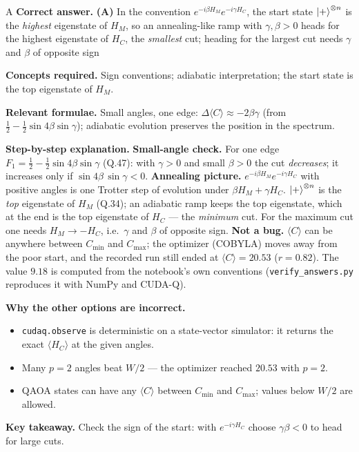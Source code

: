 \documentclass[11pt,a4paper]{article}
\newcommand{\qsep}{\par\vspace{2pt}{\color{black!15}\hrule}\vspace{4pt}}
\begin{document}
\begin{solbox}{A}
\textbf{\color{brand}Correct answer.} \textcolor{okgreen}{\textbf{(A)}} In the convention $e^{-i\beta H_M}e^{-i\gamma H_C}$, the start state $\ket+^{\otimes n}$ is the \emph{highest} eigenstate of $H_M$, so an annealing-like ramp with $\gamma, \beta > 0$ heads for the highest eigenstate of $H_C$, the \emph{smallest} cut; heading for the largest cut needs $\gamma$ and $\beta$ of opposite sign

\textbf{\color{brand}Concepts required.} Sign conventions; adiabatic interpretation; the start state is the top eigenstate of $H_M$.

\textbf{\color{brand}Relevant formulae.} Small angles, one edge: $\Delta\langle C\rangle \approx -2\beta\gamma$ (from $\tfrac12 - \tfrac12\sin4\beta\sin\gamma$); adiabatic evolution preserves the position in the spectrum.

\textbf{\color{brand}Step-by-step explanation.} \textbf{Small-angle check.} For one edge $F_1 = \tfrac12 - \tfrac12\sin4\beta\sin\gamma$ (Q.47): with $\gamma > 0$ and small $\beta > 0$ the
cut \emph{decreases}; it increases only if $\sin4\beta\,\sin\gamma < 0$.
\textbf{Annealing picture.} $e^{-i\beta H_M}e^{-i\gamma H_C}$ with positive angles is one Trotter step of evolution under
$\beta H_M + \gamma H_C$. $\ket+^{\otimes n}$ is the \emph{top} eigenstate of $H_M$ (Q.34); an adiabatic ramp keeps the top
eigenstate, which at the end is the top eigenstate of $H_C$ --- the \emph{minimum} cut. For the maximum cut one needs
$H_M \to -H_C$, i.e.\ $\gamma$ and $\beta$ of opposite sign.
\textbf{Not a bug.} $\langle C\rangle$ can be anywhere between $C_{\min}$ and $C_{\max}$; the optimizer (COBYLA) moves away from the poor
start, and the recorded run still ended at $\langle C\rangle = 20.53$ ($r = 0.82$). The value $9.18$ is computed from the notebook's
own conventions (\texttt{verify\_answers.py} reproduces it with NumPy and CUDA-Q).

\textbf{\color{brand}Why the other options are incorrect.}
\begin{itemize}[leftmargin=2.4em, itemsep=1pt, topsep=2pt]
\item[\textbf{(B)}] \texttt{cudaq.observe} is deterministic on a state-vector simulator: it returns the exact $\langle H_C\rangle$ at the given angles.
\item[\textbf{(C)}] Many $p = 2$ angles beat $W/2$ --- the optimizer reached $20.53$ with $p = 2$.
\item[\textbf{(D)}] QAOA states can have any $\langle C\rangle$ between $C_{\min}$ and $C_{\max}$; values below $W/2$ are allowed.
\end{itemize}
\textbf{\color{brand}Key takeaway.} Check the sign of the start: with $e^{-i\gamma H_C}$ choose $\gamma\beta < 0$ to head for large cuts.
\end{solbox}
\qsep
\end{document}
